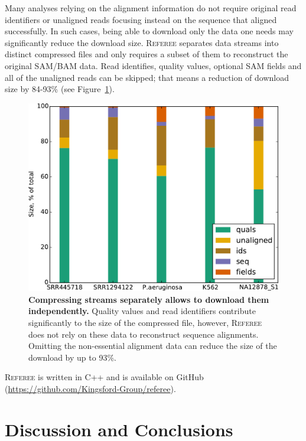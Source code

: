 \documentclass[12pt]{cmuthesis}
\newcommand{\refer}{\textsc{Referee}\xspace}
\begin{document}
Many analyses relying on the alignment information do not require original read identifiers or unaligned reads focusing instead on the sequence that aligned successfully. In such cases, being able to download only the data one needs may significantly reduce the download size. \refer separates data streams into distinct compressed files and only requires a subset of them to reconstruct the original SAM/BAM data. Read identifies, quality values, optional SAM fields and all of the unaligned reads can be skipped; that means a reduction of download size by 84-93\% (see Figure~\ref{fig:fields}).


\begin{figure}[ht!]
  \centering
  \includegraphics[width=0.6\linewidth]{figures/Referee-size-breakdown-May4}
  \caption{\textbf{Compressing streams separately allows to download them independently.} Quality values and read identifiers contribute significantly to the size of the compressed file, however, \refer does not rely on these data to reconstruct sequence alignments. Omitting the non-essential alignment data can reduce the size of the download by up to 93\%.}
  \label{fig:fields}
\end{figure}



\refer is written in C++ and is available on GitHub (\url{https://github.com/Kingsford-Group/referee}).

\chapter{Discussion and Conclusions}
\end{document}
